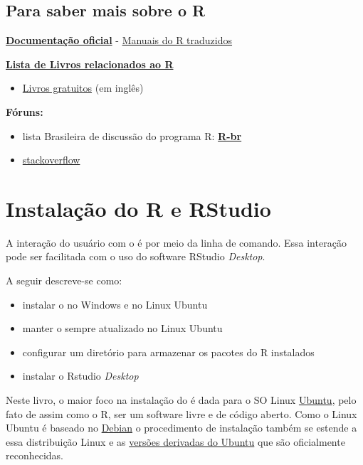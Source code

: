 \documentclass[]{book}
\providecommand{\tightlist}{%
  \setlength{\itemsep}{0pt}\setlength{\parskip}{0pt}}
\begin{document}
\section{Para saber mais sobre o R}\label{para-saber-mais-sobre-o-r}

\href{http://cran.r-project.org/manuals.html}{\textbf{Documentação
oficial}} - \href{https://cran.r-project.org/other-docs.html}{Manuais do
R traduzidos}

\href{http://www.r-project.org/doc/bib/R-books.html}{\textbf{Lista de
Livros relacionados ao R}}

\begin{itemize}
\tightlist
\item
  \href{https://github.com/vhf/free-programming-books/blob/master/free-programming-books.md\#r}{Livros
  gratuitos} (em inglês)
\end{itemize}

\textbf{Fóruns:}

\begin{itemize}
\item
  lista Brasileira de discussão do programa R:
  \href{https://listas.inf.ufpr.br/cgi-bin/mailman/listinfo/r-br}{\textbf{R-br}}
\item
  \href{http://stackoverflow.com/questions/tagged/r}{stackoverflow} 
\end{itemize}

\chapter{Instalação do R e RStudio}\label{install}

A interação do usuário com o é por meio da linha de comando. Essa
interação pode ser facilitada com o uso do software RStudio
\emph{Desktop}.

A seguir descreve-se como:

\begin{itemize}
\item
  instalar o no Windows e no Linux Ubuntu
\item
  manter o sempre atualizado no Linux Ubuntu
\item
  configurar um diretório para armazenar os pacotes do R instalados
\item
  instalar o Rstudio \emph{Desktop}
\end{itemize}

Neste livro, o maior foco na instalação do é dada para o SO Linux
\href{https://pt.wikipedia.org/wiki/Ubuntu}{Ubuntu}, pelo fato de assim
como o R, ser um software livre e de código aberto. Como o Linux Ubuntu
é baseado no \href{https://pt.wikipedia.org/wiki/Debian}{Debian} o
procedimento de instalação também se estende a essa distribuição Linux e
as
\href{https://pt.wikipedia.org/wiki/Ubuntu\#Projetos_derivados}{versões
derivadas do Ubuntu} que são oficialmente reconhecidas.
\end{document}
